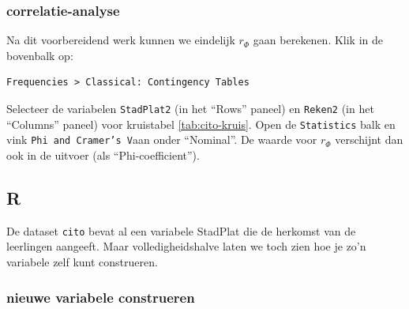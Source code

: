 \documentclass[
]{book}
\newenvironment{Shaded}{\begin{snugshade}}{\end{snugshade}}
\newcommand{\CommentTok}[1]{\textcolor[rgb]{0.56,0.35,0.01}{\textit{#1}}}
\newcommand{\DecValTok}[1]{\textcolor[rgb]{0.00,0.00,0.81}{#1}}
\newcommand{\KeywordTok}[1]{\textcolor[rgb]{0.13,0.29,0.53}{\textbf{#1}}}
\newcommand{\NormalTok}[1]{#1}
\newcommand{\OperatorTok}[1]{\textcolor[rgb]{0.81,0.36,0.00}{\textbf{#1}}}
\newcommand{\StringTok}[1]{\textcolor[rgb]{0.31,0.60,0.02}{#1}}
\begin{document}
\hypertarget{correlatie-analyse-1}{%
\subsubsection{correlatie-analyse}\label{correlatie-analyse-1}}

Na dit voorbereidend werk kunnen we eindelijk \(r_\Phi\) gaan berekenen. Klik in de bovenbalk op:

\begin{verbatim}
Frequencies > Classical: Contingency Tables
\end{verbatim}

Selecteer de variabelen \texttt{StadPlat2} (in het ``Rows'' paneel) en \texttt{Reken2} (in het ``Columns'' paneel) voor kruistabel \ref{tab:cito-kruis}. Open de \texttt{Statistics} balk en vink \texttt{Phi\ and\ Cramer’s\ V}aan onder ``Nominal''. De waarde voor \(r_\Phi\) verschijnt dan ook in de uitvoer (als ``Phi-coefficient'').

\hypertarget{r-10}{%
\subsection{R}\label{r-10}}

De dataset \texttt{cito} bevat al een variabele StadPlat die de herkomst van de leerlingen aangeeft. Maar volledigheidshalve laten we toch zien hoe je zo'n variabele zelf kunt construeren.

\hypertarget{nieuwe-variabele-construeren-2}{%
\subsubsection{nieuwe variabele construeren}\label{nieuwe-variabele-construeren-2}}

\begin{Shaded}
\end{Shaded}
\end{document}
